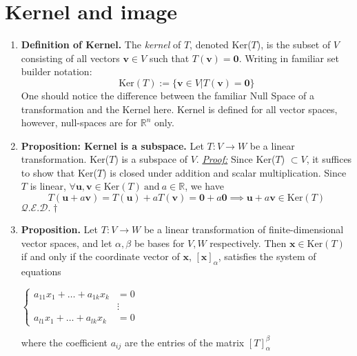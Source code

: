 \documentclass[oneside, 12pt]{book}
\newcommand{\settag}[1]{\renewcommand{\theenumi}{#1}}
\newcommand{\R}{\mathbb{R}}
\newcommand{\qed}{\hfill $\mathcal{Q}.\mathcal{E}.\mathcal{D}.\dagger$}
\newcommand{\tbf}[1]{\textbf{#1}}
\newcommand{\tit}[1]{\textit{#1}}
\newcommand{\proof}{\tit{\underline{Proof:}}} %
\newcommand{\para}[1]{\item \tbf{#1}}
\newcommand{\vv}{\mathbf{v}}
\newcommand{\vu}{\mathbf{u}}
\newcommand{\bx}{\mathbf{x}}
\begin{document}
\section{Kernel and image}
    \begin{enumerate}
        \settag{2.3.1}
        \item \tbf{Definition of Kernel.} The \tit{kernel} of $T$, denoted Ker($T$), is the subset of $V$ consisting of all vectors $\vv\in V$ such that $T(\vv) = \mathbf{0}$. Writing in familiar set builder notation:
        \begin{equation*}
            \text{Ker}(T) := \{\vv \in V | T(\vv) = \mathbf{0}\}
        \end{equation*}
        One should notice the difference between the familiar Null Space of a transformation and the Kernel here. Kernel is defined for all vector spaces, however, null-spaces are for $\R^n$ only.
        
        \settag{2.3.2}
        \item \tbf{Proposition: Kernel is a subspace.} Let $T: V\xrightarrow{} W$ be a linear transformation. Ker($T$) is a subspace of $V$. \newline
        \proof \newline
        Since Ker($T$) $\subset V$, it suffices to show that Ker($T$) is closed under addition and scalar multiplication. Since $T$ is linear, $\forall \vu, \vv \in \text{Ker}(T)~\text{and}~a\in \R$, we have
        \begin{equation*}
            T(\vu + a\vv) = T(\vu) + aT(\vv) = \mathbf{0} + a\mathbf{0} \implies \vu + a\vv \in \text{Ker}(T)
        \end{equation*}
        \qed
        
        \settag{2.3.7}
        \para{Proposition.} Let $T:V\rightarrow{} W$ be a linear transformation of finite-dimensional vector spaces, and let $\alpha, \beta$ be bases for $V,W$ respectively. Then $\bx \in \text{Ker}(T)$ if and only if the coordinate vector of $\bx$, $[\bx]_\alpha$, satisfies the system of equations
        \begin{center}
            $\begin{cases}
            a_{11}x_1 + \ldots + a_{1k}x_k &= 0 \\
            &\vdots \\
            a_{l1}x_1 + \ldots + a_{lk}x_k &= 0
            \end{cases}$
        \end{center}
        where the coefficient $a_{ij}$ are the entries of the matrix $[T]_\alpha^\beta$
        

\end{enumerate}
\end{document}

